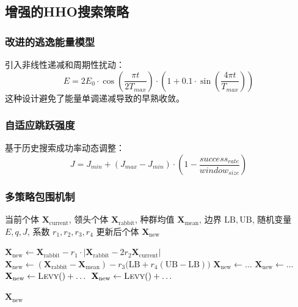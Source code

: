\documentclass[conference]{IEEEtran}
\begin{document}
\subsection{增强的HHO搜索策略}
\subsubsection{改进的逃逸能量模型}
引入非线性递减和周期性扰动：
\begin{equation}
E = 2E_0 \cdot \cos\left(\frac{\pi t}{2T_{max}}\right) \cdot \left(1 + 0.1 \cdot \sin\left(\frac{4\pi t}{T_{max}}\right)\right)
\end{equation}
这种设计避免了能量单调递减导致的早熟收敛。
\subsubsection{自适应跳跃强度}
基于历史搜索成功率动态调整：
\begin{equation}
J = J_{min} + (J_{max} - J_{min}) \cdot \left(1 - \frac{success_{rate}}{window_{size}}\right)
\end{equation}
\subsubsection{多策略包围机制}
\label{subsec:multi_encircle}
\begin{algorithm}
  \caption{多策略包围更新}
  \label{alg:multi_encircle}
  \begin{algorithmic}[1]
    \REQUIRE 当前个体 $\mathbf{X}_{\text{current}}$,  
             领头个体 $\mathbf{X}_{\text{rabbit}}$,  
             种群均值 $\mathbf{X}_{\text{mean}}$,  
             边界 $\mathrm{LB},\mathrm{UB}$,  
             随机变量 $E,q,J$, 系数 $r_1,r_2,r_3,r_4$
    \ENSURE 更新后个体 $\mathbf{X}_{\text{new}}$

            \STATE $\mathbf{X}_{\text{new}} \leftarrow
                   \mathbf{X}_{\text{rabbit}}
                   - r_1 \cdot \bigl|
                     \mathbf{X}_{\text{rabbit}}
                     - 2 r_2 \mathbf{X}_{\text{current}}
                     \bigr|$
        \ELSE
            \STATE $\mathbf{X}_{\text{new}} \leftarrow
                   (\mathbf{X}_{\text{rabbit}} - \mathbf{X}_{\text{mean}})
                   - r_3 \bigl(\mathrm{LB}
                   + r_4(\mathrm{UB} - \mathrm{LB})\bigr)$
        \ENDIF
    \ELSE               %
            \STATE $\mathbf{X}_{\text{new}} \leftarrow \dots$   %
            \STATE $\mathbf{X}_{\text{new}} \leftarrow \dots$   %
            \STATE $\mathbf{X}_{\text{new}} \leftarrow
                   \textsc{Levy}() + \dots$                    %
        \ELSE
            \STATE $\mathbf{X}_{\text{new}} \leftarrow
                   \textsc{Levy}() + \dots$                    %
        \ENDIF
    \ENDIF

    \RETURN $\mathbf{X}_{\text{new}}$
  \end{algorithmic}
\end{algorithm}
\end{document}

